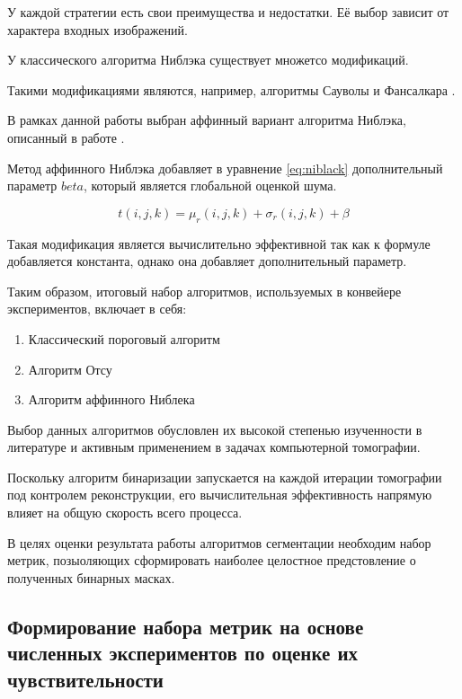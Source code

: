У каждой стратегии есть свои преимущества и недостатки. Её выбор зависит от характера входных изображений.

У классического алгоритма Ниблэка существует множетсо модификаций.

Такими модификациями являются, например, алгоритмы Сауволы \cite{sauvola2000adaptive} и Фансалкара \cite{phansalkar2011adaptive}.

В рамках данной работы выбран аффинный вариант алгоритма Ниблэка, описанный в работе \cite{николаев2013критерии}.

Метод аффинного Ниблэка добавляет в уравнение \ref{eq:niblack} дополнительный параметр \(beta\), который является глобальной оценкой шума.

\begin{equation}\label{eq:niblack_affine}
    t(i, j, k) = \mu_r(i, j, k) + \sigma_r(i, j, k) + \beta
\end{equation}

Такая модификация является вычислительно эффективной так как к формуле добавляется константа, однако она добавляет дополнительный параметр. 

Таким образом, итоговый набор алгоритмов, используемых в конвейере экспериментов, включает в себя:

\begin{enumerate}
    \item Классический пороговый алгоритм
    \item Алгоритм Отсу
    \item Алгоритм аффинного Ниблека
\end{enumerate}

Выбор данных алгоритмов обусловлен их высокой степенью изученности в литературе и активным применением в задачах компьютерной томографии.

Поскольку алгоритм бинаризации запускается на каждой итерации томографии под контролем реконструкции, его вычислительная эффективность напрямую влияет на общую скорость всего процесса.

В целях оценки результата работы алгоритмов сегментации необходим набор метрик, позыоляющих сформировать наиболее целостное предстовление о полученных бинарных масках.

\subsection{Формирование набора метрик на основе численных экспериментов по оценке их чувствительности}


